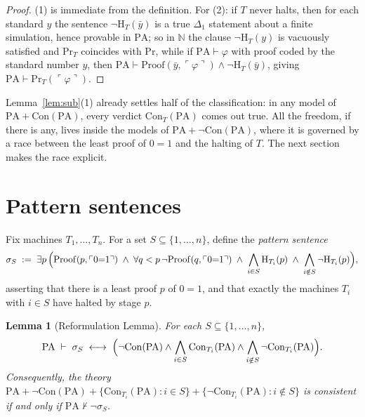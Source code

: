 \documentclass[11pt]{amsart}
\newtheorem{lemma}[theorem]{Lemma}
\theoremstyle{definition}
\theoremstyle{remark}
\newcommand{\PA}{\mathrm{PA}}
\newcommand{\Con}{\mathrm{Con}}
\newcommand{\Pf}{\mathrm{Proof}}
\newcommand{\Prov}{\mathrm{Pr}}
\newcommand{\HT}[1]{\mathrm{H}_{#1}}
\newcommand{\godel}[1]{\ulcorner #1 \urcorner}
\newcommand{\N}{\mathbb{N}}
\begin{document}
\begin{proof}
(1) is immediate from the definition. For (2): if $T$ never halts, then
for each standard $y$ the sentence $\neg\HT{T}(\bar y)$ is a true
$\Delta_1$ statement about a finite simulation, hence provable in $\PA$;
so in $\N$ the clause $\neg\HT{T}(y)$ is vacuously satisfied and
$\Prov_T$ coincides with $\Prov$, while if $\PA\vdash\varphi$ with proof
coded by the standard number $y$, then
$\PA\vdash\Pf(\bar y,\godel{\varphi})\wedge\neg\HT{T}(\bar y)$, giving
$\PA\vdash\Prov_T(\godel{\varphi})$.
\end{proof}

Lemma~\ref{lem:sub}(1) already settles half of the classification: in any
model of $\PA+\Con(\PA)$, every verdict $\Con_T(\PA)$ comes out true.
All the freedom, if there is any, lives inside the models of
$\PA+\neg\Con(\PA)$, where it is governed by a race between the least
proof of $0{=}1$ and the halting of $T$. The next section makes the race
explicit.

\section{Pattern sentences}\label{sec:patterns}

Fix machines $T_1,\dots,T_n$. For a set $S\subseteq\{1,\dots,n\}$, define
the \emph{pattern sentence}
\[
\sigma_S \;:=\; \exists p\,\Bigl(\Pf(p,\godel{0{=}1})
   \;\wedge\; \forall q<p\,\neg\Pf(q,\godel{0{=}1})
   \;\wedge\; \bigwedge_{i\in S}\HT{T_i}(p)
   \;\wedge\; \bigwedge_{i\notin S}\neg\HT{T_i}(p)\Bigr),
\]
asserting that there is a least proof $p$ of $0{=}1$, and that exactly the
machines $T_i$ with $i\in S$ have halted by stage $p$.

\begin{lemma}[Reformulation Lemma]\label{lem:pattern}
For each $S\subseteq\{1,\dots,n\}$,
\[
\PA\;\vdash\;\sigma_S\;\longleftrightarrow\;
\Bigl(\neg\Con(\PA)\wedge\bigwedge_{i\in S}\Con_{T_i}(\PA)
      \wedge\bigwedge_{i\notin S}\neg\Con_{T_i}(\PA)\Bigr).
\]
Consequently, the theory
$\PA+\neg\Con(\PA)+\{\Con_{T_i}(\PA):i\in S\}
+\{\neg\Con_{T_i}(\PA):i\notin S\}$
is consistent if and only if $\PA\nvdash\neg\sigma_S$.
\end{lemma}
\end{document}

